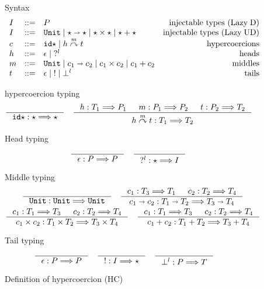 \documentclass[acmsmall,review,anonymous]{acmart}\settopmatter{printfolios=true,printccs=false,printacmref=false}
\newcommand{\stxrule}[3]{#1 & ::= & #3 & \text{#2}\\}
\newcommand{\plus}[0]{+}
\newcommand{\lazyUD}{Lazy\;UD}
\newcommand{\lazyD}{Lazy\;D}
\newcommand{\TOOdyn}[0]{\star}
\newcommand{\POOunit}[0]{\mathtt{Unit}}
\newcommand{\POOfun}[2]{#1 \shortrightarrow #2}
\newcommand{\POOprod}[2]{#1 \times #2}
\newcommand{\POOsum}[2]{#1 \plus #2}
\newcommand{\typingHC}[3]{#1 : #2 \Longrightarrow #3}
\newcommand{\hyperCoercionI}[0]{\mathtt{id\star}}
\newcommand{\hyperCoercionC}[3]{#1 \overset{#2}{\curvearrowright} #3}
\begin{document}
\begin{figure}
	Syntax
	\[
	\begin{array}{lclr}
	\stxrule{I}{injectable types (\lazyD)}{P}
	\stxrule{I}{injectable types (\lazyUD)}{
		\POOunit \mid
		\POOfun{\TOOdyn}{\TOOdyn} \mid
		\POOprod{\TOOdyn}{\TOOdyn} \mid
		\POOsum{\TOOdyn}{\TOOdyn}
	}
	\stxrule{c}{hypercoercions}{
		\hyperCoercionI \mid{}
		\hyperCoercionC{h}{m}{t}
	}
	\stxrule{h}{heads}{
		\epsilon \mid{}
		?^l
	}
	\stxrule{m}{middles}{
		\POOunit \mid
		\POOfun{c_1}{c_2} \mid
		\POOprod{c_1}{c_2} \mid
		\POOsum{c_1}{c_2}
	}
	\stxrule{t}{tails}{
		\epsilon \mid{}
		! \mid{}
		\bot^l
	}
	\end{array}
	\]
		
	hypercoercion typing 
	\begin{gather*}
	\inference{}{\typingHC{\hyperCoercionI}{\TOOdyn}{\TOOdyn}}
	\quad
	\inference{
		\typingHC{h}{T_1}{P_1} &
		\typingHC{m}{P_1}{P_2} &
		\typingHC{t}{P_2}{T_2}
	}{
		\typingHC{\hyperCoercionC{h}{m}{t}}{T_1}{T_2}
	}
	\end{gather*}
	
	Head typing \fbox{$ \typingHC{h}{T}{P} $}
	\begin{gather*}
	\inference{}{\typingHC{\epsilon}{P}{P}}
	\quad
	\inference{}{\typingHC{?^l}{\TOOdyn}{I}}
	\end{gather*}
	
	Middle typing \fbox{$ \typingHC{m}{T}{T} $}
	\begin{gather*}
	\inference{}{\typingHC{\POOunit}{\POOunit}{\POOunit}}
	\quad
	\inference{
		\typingHC{c_1}{T_3}{T_1} &
		\typingHC{c_2}{T_2}{T_4}
	}{
		\typingHC{\POOfun{c_1}{c_2}}{\POOfun{T_1}{T_2}}{\POOfun{T_3}{T_4}}
	}
	\\
	\inference{
		\typingHC{c_1}{T_1}{T_3} &
		\typingHC{c_2}{T_2}{T_4}
	}{
		\typingHC{\POOprod{c_1}{c_2}}{\POOprod{T_1}{T_2}}{\POOprod{T_3}{T_4}}
	}
	\quad
	\inference{
		\typingHC{c_1}{T_1}{T_3} &
		\typingHC{c_2}{T_2}{T_4}
	}{
		\typingHC{\POOsum{c_1}{c_2}}{\POOsum{T_1}{T_2}}{\POOsum{T_3}{T_4}}
	}
		\end{gather*}
		
		Tail typing \fbox{$ \typingHC{t}{P}{T} $}
		\begin{gather*}
		\inference{}{\typingHC{\epsilon}{P}{P}} \quad
		\inference{}{\typingHC{!}{I}{\TOOdyn}} \quad
		\inference{}{\typingHC{\bot^l}{P}{T}} \quad
		\end{gather*}
	
	\caption{Definition of hypercoercion (HC)}
	\label{fig:hypercoercion}
\end{figure}
\end{document}
